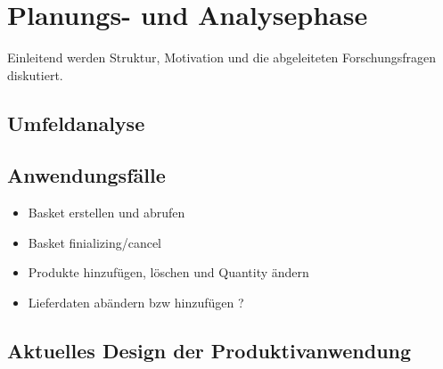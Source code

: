 

\chapter{Planungs- und Analysephase}

Einleitend werden Struktur, Motivation und die abgeleiteten Forschungsfragen diskutiert.

\section{Umfeldanalyse}
\blindtext

\section{Anwendungsfälle}

\begin{itemize}[noitemsep,nolistsep]
	\item Basket erstellen und abrufen
	\item Basket finializing/cancel
	\item Produkte hinzufügen, löschen und Quantity ändern
	\item Lieferdaten abändern bzw hinzufügen ?
\end{itemize}

\blindtext


\section{Aktuelles Design der Produktivanwendung}
\blindtext
